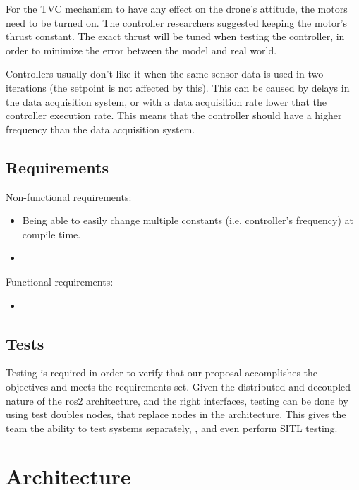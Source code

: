 \documentclass[a4paper]{article}
\begin{document}
For the TVC mechanism to have any effect on the drone's attitude, the motors need to be turned on. 
The controller researchers suggested keeping the motor's thrust constant. The exact thrust will be tuned when testing the controller, in order to minimize the error between the model and real world. 

Controllers usually don't like it when the same sensor data is used in two iterations (the setpoint is not affected by this). 
This can be caused by delays in the data acquisition system, or with a data acquisition rate lower that the controller execution rate. 
This means that the controller should have a higher frequency than the data acquisition system.



\subsection{Requirements}

Non-functional requirements: 
\begin{itemize}
    \item Being able to easily change multiple constants (i.e. controller's frequency) at compile time. 
    \item 
\end{itemize}

Functional requirements:
\begin{itemize}
    \item 
\end{itemize}

\subsection{Tests}

Testing is required in order to verify that our proposal accomplishes the objectives and meets the requirements set. 
Given the distributed and decoupled nature of the ros2 architecture, and the right interfaces, testing can be done by using test doubles nodes, that replace nodes in the architecture. 
This gives the team the ability to test systems separately, , and even perform SITL testing. 



\clearpage
\section{Architecture}
\end{document}
